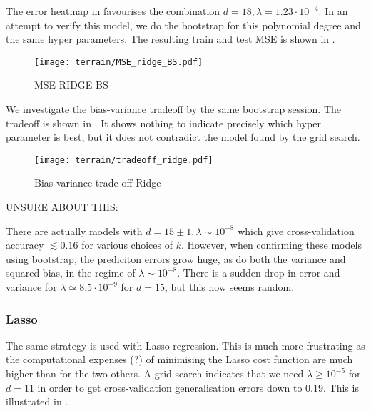         The error heatmap in  favourises the combination $d=18, \lambda = 1.23\cdot 10^{-4}$. In an attempt to verify this model, we do the bootstrap for this polynomial degree and the same hyper parameters. The resulting train and test MSE is shown in .

        \begin{figure}
            \texttt{[image: terrain/MSE\_ridge\_BS.pdf]}
            \caption{MSE RIDGE BS}
            \label{fig:gc_model_complexity_ridge}
        \end{figure}

        We investigate the bias-variance tradeoff by the same bootstrap session. The tradeoff is shown in . It shows nothing to indicate precisely which hyper parameter is best, but it does not contradict the model found by the grid search.

        \begin{figure}
            \texttt{[image: terrain/tradeoff\_ridge.pdf]}
            \caption{Bias-variance trade off Ridge}
            \label{fig:gc_bias_variance_ridge}
        \end{figure}

        \par
        UNSURE ABOUT THIS:

        There are actually models with $d=15\pm 1, \lambda\sim  10^{-8}$ which give cross-validation accuracy $\lesssim 0.16$ for various choices of $k$. However, when confirming these models using bootstrap, the prediciton errors grow huge, as do both the variance and squared bias, in the regime of $\lambda\sim 10^{-8}$. There is a sudden drop in error and variance for $\lambda \simeq 8.5 \cdot 10^{-9}$ for $d=15$, but this now seems random.


        \subsubsection{Lasso}\label{sec:gc_lassoanalysis}

        The same strategy is used with Lasso regression. This is much more frustrating as the computational expenses (?) of minimising the Lasso cost function are much higher than for the two others. A grid search indicates that we need $\lambda \geq 10^{-5}$ for $d=11$ in order to get cross-validation generalisation errors down to $0.19$. This is illustrated in .

